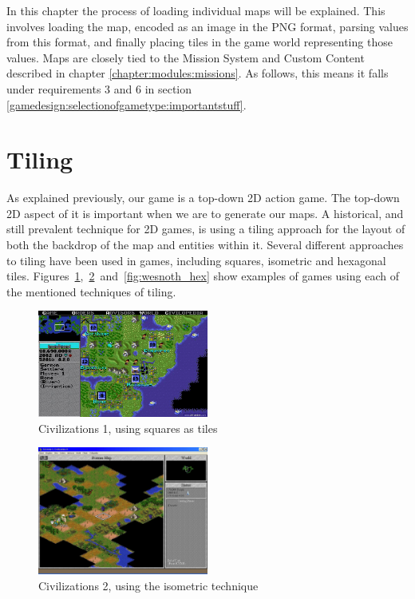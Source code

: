 In this chapter the process of loading individual maps will be explained.
This involves loading the map, encoded as an image in the PNG format, parsing values from this format, and finally placing tiles in the game world representing those values.
Maps are closely tied to the Mission System and Custom Content described in chapter \ref{chapter:modules:missions}.
As follows, this means it falls under requirements 3 and 6 in section \ref{gamedesign:selectionofgametype:importantstuff}.

\section{Tiling}
As explained previously, our game is a top-down 2D action game.
The top-down 2D aspect of it is important when we are to generate our maps.
A historical, and still prevalent technique for 2D games, is using a tiling approach for the layout of both the backdrop of the map and entities within it.
Several different approaches to tiling have been used in games, including squares, isometric and hexagonal tiles.
Figures~\ref{fig:civ-1_square},~\ref{fig:civ-2_iso}~and~\ref{fig:wesnoth_hex}
show examples of games using each of the mentioned techniques of tiling.

\begin{figure}[H]
    \centering
    \includegraphics[width=0.5\textwidth]{figures/generating_levels/civ-1_square.png}
    \caption{Civilizations 1, using squares as tiles}\label{fig:civ-1_square}
\end{figure}

\begin{figure}[H]
    \centering
    \includegraphics[width=0.5\textwidth]{figures/generating_levels/civ-2_iso.png}
    \caption{Civilizations 2, using the isometric technique}\label{fig:civ-2_iso}
\end{figure}

